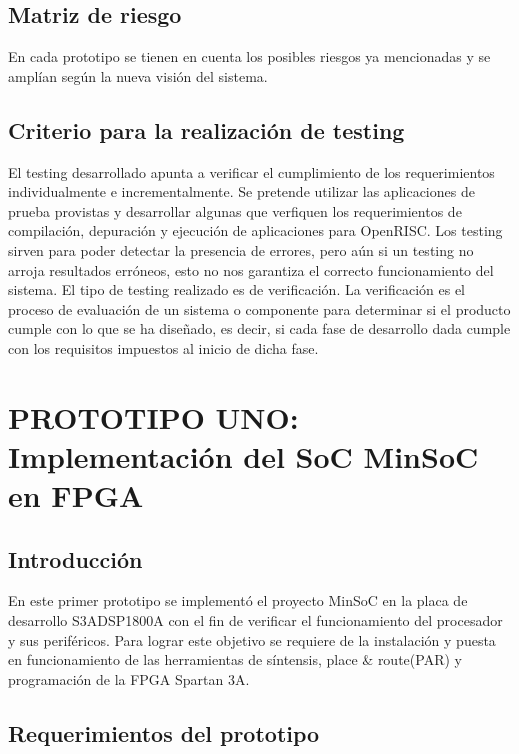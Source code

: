 		\subsection{Matriz de riesgo}
En cada prototipo se tienen en cuenta los posibles riesgos ya mencionadas y se amplían según la nueva visión del sistema.
		
		\subsection{Criterio para la realización de testing}%
		El testing desarrollado apunta a verificar el cumplimiento de los requerimientos individualmente e incrementalmente. Se pretende utilizar las
		aplicaciones de prueba provistas y desarrollar algunas que verfiquen los requerimientos de compilación, depuración y ejecución de aplicaciones para
		OpenRISC. 
		Los testing sirven para poder detectar la presencia de errores, pero aún si un testing no arroja resultados erróneos, esto no nos garantiza el
		correcto funcionamiento del sistema. El tipo de testing realizado es de verificación. La verificación es el proceso de evaluación de un sistema o
		componente para determinar si el producto cumple con lo que se ha diseñado, es decir, si cada fase de desarrollo dada cumple con los requisitos
		impuestos al inicio de dicha fase.

	\newpage
	\section{PROTOTIPO UNO: Implementación del SoC MinSoC en FPGA}
		\subsection{Introducción}
		
	En este primer prototipo se implementó el proyecto MinSoC en la placa de desarrollo S3ADSP1800A con el fin de verificar el funcionamiento del procesador y sus periféricos. Para lograr este objetivo se requiere de la instalación y puesta en funcionamiento de las herramientas de síntensis, place \& route(PAR) y programación de la FPGA Spartan 3A. 

		\subsection{Requerimientos del prototipo}
		
